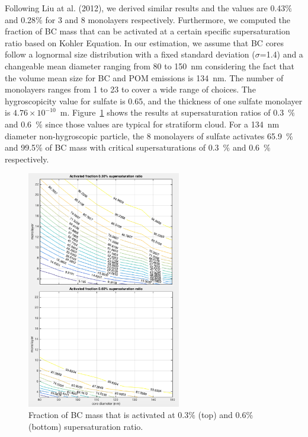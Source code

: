 \documentclass[12pt, fullpage]{uiucthesis2009}
\begin{document}
	Following Liu at al. (2012), we derived similar results and the values are 0.43$\%$ and 0.28$\%$ for 3 and 8 monolayers respectively. Furthermore, we computed the fraction of BC mass that can be activated at a certain specific supersaturation ratio based on Kohler Equation. In our estimation, we assume that BC cores follow a lognormal size distribution with a fixed standard deviation ($\sigma$=1.4) and a changeable mean diameter ranging from 80 to 150~nm considering the fact that the volume mean size for BC and POM emissions is 134~nm. The number of monolayers ranges from 1 to 23 to cover a wide range of choices. The hygroscopicity value for sulfate is 0.65, and the thickness of one sulfate monolayer is $4.76 \times 10^{-10}$~m. Figure~\ref{fig_P10} shows the results at supersaturation ratios of 0.3~$\%$ and 0.6~$\%$ since those values are typical for stratiform cloud. For a 134~nm diameter non-hygroscopic particle, the 8 monolayers of sulfate activates 65.9~$\%$ and 99.5$\%$ of BC mass with critical supersaturations of 0.3~$\%$ and 0.6~$\%$ respectively.  
	
	\begin{figure}[h] 
		\begin{center}
			\includegraphics[width = 0.6\textwidth]{Figure10}
			\caption[Fraction of BC mass that is activated at 0.3$\%$ (top) and 0.6$\%$ (bottom) supersaturation ratio]{\label{fig_P10} Fraction of BC mass that is activated at 0.3$\%$ (top) and 0.6$\%$ (bottom) supersaturation ratio.}
		\end{center}
	\end{figure}
\end{document}
